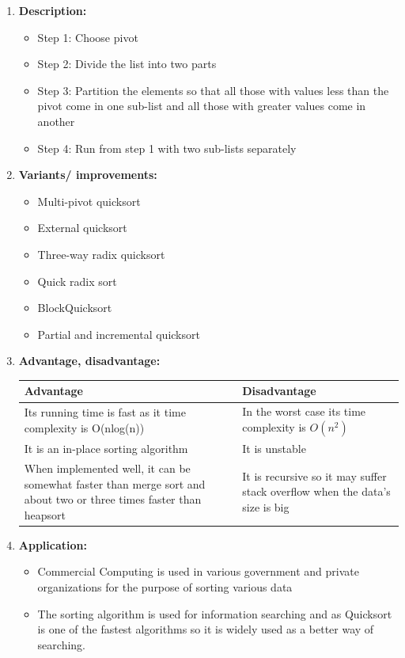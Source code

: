 \documentclass[11pt,a4paper]{article}
\begin{document}
{\begin{enumerate}[label=\textbf{\arabic*})]
				\item \textbf{Description:}
				\begin{itemize}
					\item Step 1: Choose pivot
                    \item Step 2: Divide the list into two parts
                    \item Step 3: Partition the elements so that all those with values less than the pivot come in one sub-list and all those with greater values come in another
                    \item Step 4: Run from step 1 with two sub-lists separately	
				\end{itemize}
				\item \textbf{Variants/ improvements:}
					\begin{itemize}
						\item Multi-pivot quicksort
						\item External quicksort
						\item Three-way radix quicksort
						\item Quick radix sort
						\item BlockQuicksort
						\item Partial and incremental quicksort
					\end{itemize}
				\item \textbf{Advantage, disadvantage:}
					\begin{table}[H]
						\centering
						\begin{tabular}{|p{8cm}|p{8cm}|}
							\hline
							\textbf{Advantage} & \textbf{Disadvantage} \\
							\hline
							\hline
							Its running time is fast as it time complexity is O(nlog(n)) & In the worst case its time complexity is $O(n^2)$ \\[12pt]
							It is an in-place sorting algorithm & It is unstable\\[12pt]
							When implemented well, it can be somewhat faster than merge sort and about two or three times faster than heapsort & It is recursive so it may suffer stack overflow when the data’s size is big\\
							\hline
						\end{tabular}
					\end{table}
				\item \textbf{Application:}	
					\begin{itemize}
						\item Commercial Computing is used in various government and private organizations for the purpose of sorting various data
						\item The sorting algorithm is used for information searching and as Quicksort is one of the fastest algorithms so it is widely used as a better way of searching.
					\end{itemize}
			\end{enumerate}
			
}
\end{document}
